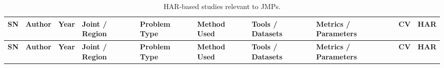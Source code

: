 \documentclass[12pt]{elsarticle}
\begin{document}
{\scriptsize
\setlength{\tabcolsep}{3pt}
\renewcommand{\arraystretch}{1.08}
\begin{longtable}{m{0.7cm} m{2.0cm} m{0.9cm} m{1.5cm} m{2.0cm} m{2.3cm} m{2.1cm} m{2.0cm} m{0.7cm} m{0.7cm}}
\caption{HAR-based studies relevant to JMPs.}
\label{HAR} \\
\hline
\textbf{SN} & \textbf{Author} & \textbf{Year} & \textbf{Joint / Region} & \textbf{Problem Type} & \textbf{Method Used} & \textbf{Tools / Datasets} & \textbf{Metrics / Parameters} & \textbf{CV} & \textbf{HAR} \\
\hline
\endfirsthead

\hline
\textbf{SN} & \textbf{Author} & \textbf{Year} & \textbf{Joint / Region} & \textbf{Problem Type} & \textbf{Method Used} & \textbf{Tools / Datasets} & \textbf{Metrics / Parameters} & \textbf{CV} & \textbf{HAR} \\
\hline
\endhead


\end{longtable}}
\end{document}
